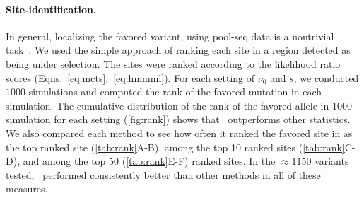 \paragraph{Site-identification.}
In general, localizing the favored variant, using pool-seq data is a nontrivial 
task~\cite{tobler2014massive}. We used the simple
approach of ranking each site in a region detected as being under
selection. The sites were ranked according to the likelihood ratio
scores (Eqns.~\ref{eq:mcts},~\ref{eq:hmmml}). For each setting of
$\nu_0$ and $s$, we conducted $1000$ simulations and computed the rank
of the favored mutation in each simulation. The cumulative
distribution of the rank of the favored allele in 1000 simulation for
each setting (\ref{fig:rank}) shows that \comale\ outperforms
other statistics. We also compared each method to see how often it
ranked the favored site in as the top ranked site
(\ref{tab:rank}A-B), among the top 10 ranked sites
(\ref{tab:rank}C-D), and among the top 50
(\ref{tab:rank}E-F) ranked sites. In the $\approx$1150 variants tested,
\comale\ performed consistently better than other methods in all of
these measures.

